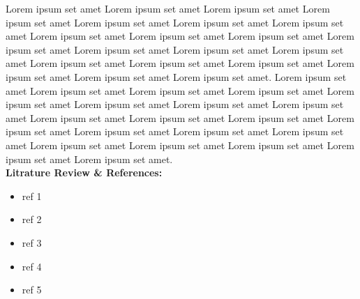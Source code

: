 \documentclass[a4paper]{article}
\begin{document}
Lorem ipsum set amet Lorem ipsum set amet Lorem ipsum set amet Lorem ipsum set amet Lorem ipsum set amet Lorem ipsum set amet Lorem ipsum set amet Lorem ipsum set amet Lorem ipsum set amet Lorem ipsum set amet Lorem ipsum set amet Lorem ipsum set amet Lorem ipsum set amet Lorem ipsum set amet Lorem ipsum set amet Lorem ipsum set amet Lorem ipsum set amet Lorem ipsum set amet Lorem ipsum set amet Lorem ipsum set amet. Lorem ipsum set amet Lorem ipsum set amet Lorem ipsum set amet Lorem ipsum set amet Lorem ipsum set amet Lorem ipsum set amet Lorem ipsum set amet Lorem ipsum set amet Lorem ipsum set amet Lorem ipsum set amet Lorem ipsum set amet Lorem ipsum set amet Lorem ipsum set amet Lorem ipsum set amet Lorem ipsum set amet Lorem ipsum set amet Lorem ipsum set amet Lorem ipsum set amet Lorem ipsum set amet Lorem ipsum set amet.\\

\indent \textbf{Litrature Review \& References: }
\begin{itemize}
\item ref 1
\item ref 2
\item ref 3
\item ref 4
\item ref 5

\end{itemize}
\end{document}
